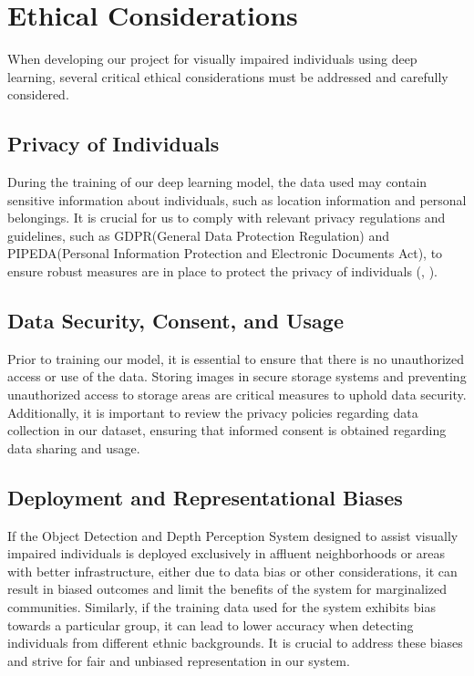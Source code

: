 \documentclass{article} %
\begin{document}



\section{Ethical Considerations}
When developing our project for visually impaired individuals using deep learning, several critical ethical considerations must be addressed and carefully considered.

\subsection{Privacy of Individuals}
During the training of our deep learning model, the data used may contain sensitive information about individuals, such as location information and personal belongings. It is crucial for us to comply with relevant privacy regulations and guidelines, such as GDPR(General Data Protection Regulation) and PIPEDA(Personal Information Protection and Electronic Documents Act), to ensure robust measures are in place to protect the privacy of individuals (\cite{gdpr}, \cite{pipeda}).

\subsection{Data Security, Consent, and Usage}
Prior to training our model, it is essential to ensure that there is no unauthorized access or use of the data. Storing images in secure storage systems and preventing unauthorized access to storage areas are critical measures to uphold data security. Additionally, it is important to review the privacy policies regarding data collection in our dataset, ensuring that informed consent is obtained regarding data sharing and usage.

\subsection{Deployment and Representational Biases}
If the Object Detection and Depth Perception System designed to assist visually impaired individuals is deployed exclusively in affluent neighborhoods or areas with better infrastructure, either due to data bias or other considerations, it can result in biased outcomes and limit the benefits of the system for marginalized communities. Similarly, if the training data used for the system exhibits bias towards a particular group, it can lead to lower accuracy when detecting individuals from different ethnic backgrounds. It is crucial to address these biases and strive for fair and unbiased representation in our system.
\end{document}
